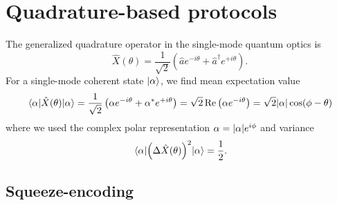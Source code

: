 \section{Quadrature-based protocols}





The generalized quadrature operator in the single-mode quantum optics is~\cite[p.~36]{Barnett2002}
\begin{equation}
	\hat{X}(\theta)
	=
	\frac{1}{\sqrt{2}}
	\left(
		\hat{a}
		e^{-i\theta}
		+
		\hat{a}^\dagger
		e^{+i\theta}
	\right)
	.
\end{equation}
For a single-mode coherent state $\ket{\alpha}$, we find mean expectation value
\begin{equation}
	\expval{\hat{X}(\theta)}{\alpha}
	=
	\frac{1}{\sqrt{2}}
	\left(
		\alpha
		e^{-i\theta}
		+
		\alpha^*
		e^{+i\theta}
	\right)
	=
	\sqrt{2}
	\operatorname{\operatorname{Re}}\left(
		\alpha
		e^{-i\theta}
	\right)
	=
	\sqrt{2}
	\abs{\alpha}
	\cos(\phi-\theta)
\end{equation}
where we used the complex polar representation $\alpha=\abs{\alpha}e^{i\phi}$ and variance~\cite[p.~59]{Barnett2002}
\begin{equation}
	\expval{\left(\Delta\hat{X}(\theta)\right)^2}{\alpha}
	=
	\frac{1}{2}
	.
\end{equation}

\subsection{Squeeze-encoding}

